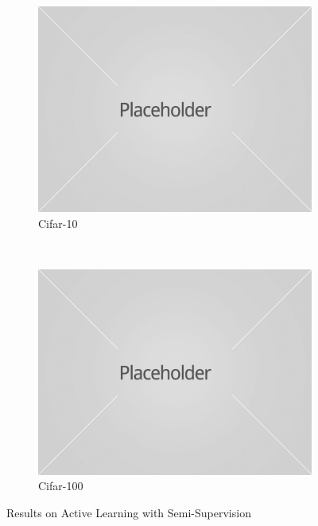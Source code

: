 \documentclass{article}
\begin{document}
\begin{figure}[ht]
    \begin{subfigure}[b]{0.4927\textwidth}
        \includegraphics[width=\textwidth]{placeholder1.jpg}
        \caption{Cifar-10}
    \end{subfigure}
    ~ %
    \begin{subfigure}[b]{0.4927\textwidth}
        \includegraphics[width=\textwidth]{placeholder1.jpg}
        \caption{Cifar-100}
    \end{subfigure}
    \caption{Results on Active Learning with Semi-Supervision}\label{fig:ressemi}
\end{figure}
\end{document}
